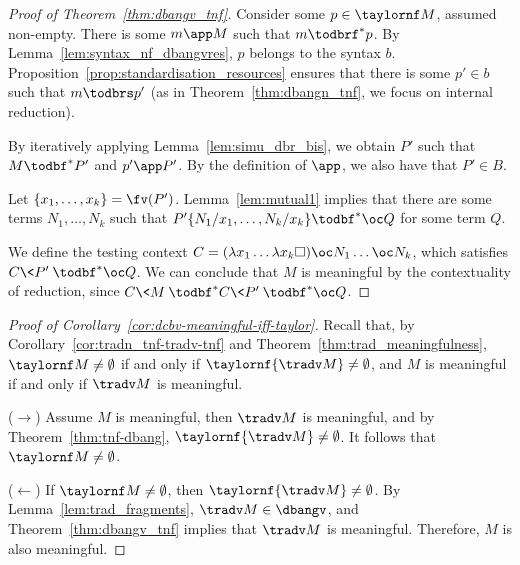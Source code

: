 \begin{proof}[Proof of Theorem~\ref{thm:dbangv_tnf}]
	Consider some
	$p\in\taylornf M$, assumed non-empty. There is some $m\app M$ such
	that $m\todbrf^*p$. By Lemma~\ref{lem:syntax_nf_dbangvres}, $p$ belongs to the syntax $b$.
	Proposition~\ref{prop:standardisation_resources} ensures that there is some $p'\in
	b$ such that $m\todbrs p'$ (as in Theorem~\ref{thm:dbangn_tnf}, we
	focus on internal reduction). 

	By iteratively applying Lemma~\ref{lem:simu_dbr_bis}, we obtain $P'$ such that
	$M\todbf^* P'$ and $p'\app P'$. By the definition of $\app$, we also
	have that $P'\in B$.

	Let $\{x_1,\dots ,x_k\}=\fv(P')$. Lemma~\ref{lem:mutual1} implies that there
	are some terms $N_1,\dots ,N_k$ such that $P'\{N_1/x_1,\dots ,N_k/x_k\}\todbf^* \oc
	Q$ for some term $Q$. 

	We define the testing context $C=(\lambda x_1\dots \lambda x_k \square)\oc
	N_1\dots \oc N_k$, which satisfies $C\<P'\>\todbf^*\oc Q$.
	We can conclude that $M$ is meaningful by the contextuality of reduction,
	since $C\<M\>\todbf^* C\<P'\>\todbf^* \oc Q$.
\end{proof}


\begin{proof}[Proof of Corollary~\ref{cor:dcbv-meaningful-iff-taylor}]
	Recall that, by Corollary~\ref{cor:tradn_tnf-tradv-tnf} and Theorem~\ref{thm:trad_meaningfulness}, 
	$\taylornf M\neq\emptyset$ if and
	only if $\taylornf {\tradv M}\neq\emptyset$, and $M$ is meaningful if
	and only if $\tradv M$ is meaningful.

	($\to$) Assume $M$ is meaningful, then $\tradv M$ is meaningful, and
	by Theorem~\ref{thm:tnf-dbang}, $\taylornf{\tradv M}\neq \emptyset$.
	It follows that $\taylornf M\neq\emptyset$.

	($\leftarrow$) If $\taylornf M\neq\emptyset$, then $\taylornf{\tradv
	M}\neq\emptyset$. By Lemma~\ref{lem:trad_fragments}, $\tradv
	M\in\dbangv$, and Theorem~\ref{thm:dbangv_tnf} implies that $\tradv M$
	is meaningful. Therefore, $M$ is also meaningful.
\end{proof}


